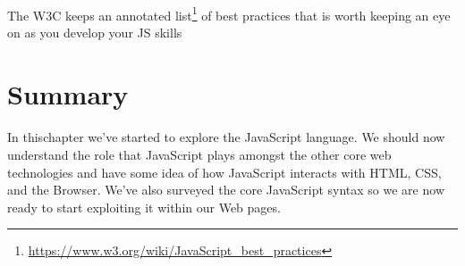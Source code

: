 \paragraph{} The W3C keeps an annotated list\footnote{\url{https://www.w3.org/wiki/JavaScript_best_practices}} of best practices that is worth keeping an eye on as you develop your JS skills


\section{Summary}
\paragraph{} In thischapter we've started to explore the JavaScript language. We should now understand the role that JavaScript plays amongst the other core web technologies and have some idea of how JavaScript interacts with HTML, CSS, and the Browser. We've also surveyed the core JavaScript syntax so we are now ready to start exploiting it within our Web pages.
